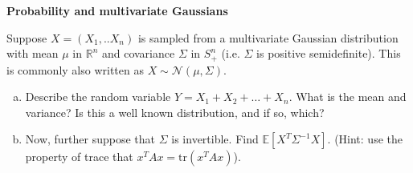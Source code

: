 \item {} \textbf{Probability and multivariate Gaussians}

  Suppose $X=(X_1,..X_n)$ is sampled from a multivariate Gaussian
  distribution with mean $\mu$ in $\mathbb{R}^n$ and covariance $\Sigma$ in $S^n_+$
  (i.e. $\Sigma$ is positive semidefinite).
  This is commonly also written as $X \sim \mathcal{N}(\mu, \Sigma)$.

  \begin{enumerate}[(a)]
  \item
  Describe the random variable $Y = X_1 + X_2 + \ldots + X_n$.
  What is the mean and variance?
  Is this a well known distribution, and if so, which?

  \item
  Now, further suppose that $\Sigma$ is invertible. Find $\mathbb{E}[X^T\Sigma^{-1}X]$.
  (Hint: use the property of trace that $x^TAx = \text{tr}(x^TAx)$).

  \end{enumerate}
